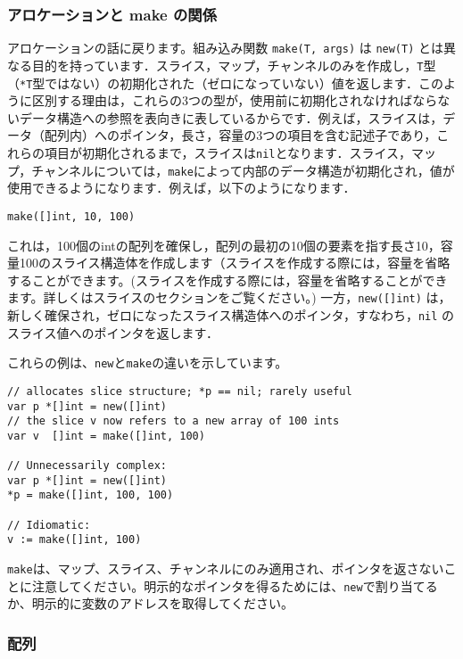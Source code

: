 \documentclass{jsarticle}
\begin{document}
\subsubsection{アロケーションと make の関係}

アロケーションの話に戻ります。組み込み関数 \texttt{make(T,\ args)} は
\texttt{new(T)}
とは異なる目的を持っています．スライス，マップ，チャンネルのみを作成し，\texttt{T}型（\texttt{*T}型ではない）の初期化された（ゼロになっていない）値を返します．このように区別する理由は，これらの3つの型が，使用前に初期化されなければならないデータ構造への参照を表向きに表しているからです．例えば，スライスは，データ（配列内）へのポインタ，長さ，容量の3つの項目を含む記述子であり，これらの項目が初期化されるまで，スライスは\texttt{nil}となります．スライス，マップ，チャンネルについては，\texttt{make}によって内部のデータ構造が初期化され，値が使用できるようになります．例えば，以下のようになります．

\begin{lstlisting}[numbers=none]
make([]int, 10, 100)
\end{lstlisting}

これは，100個のintの配列を確保し，配列の最初の10個の要素を指す長さ10，容量100のスライス構造体を作成します（スライスを作成する際には，容量を省略することができます。(スライスを作成する際には，容量を省略することができます。詳しくはスライスのセクションをご覧ください。)
一方，\texttt{new({[}{]}int)}
は，新しく確保され，ゼロになったスライス構造体へのポインタ，すなわち，\texttt{nil}
のスライス値へのポインタを返します．

これらの例は、\texttt{new}と\texttt{make}の違いを示しています。

\begin{lstlisting}[numbers=none]
// allocates slice structure; *p == nil; rarely useful
var p *[]int = new([]int)       
// the slice v now refers to a new array of 100 ints
var v  []int = make([]int, 100) 

// Unnecessarily complex:
var p *[]int = new([]int)
*p = make([]int, 100, 100)

// Idiomatic:
v := make([]int, 100)
\end{lstlisting}

\texttt{make}は、マップ、スライス、チャンネルにのみ適用され、ポインタを返さないことに注意してください。明示的なポインタを得るためには、\texttt{new}で割り当てるか、明示的に変数のアドレスを取得してください。

\subsubsection{配列}
\end{document}
